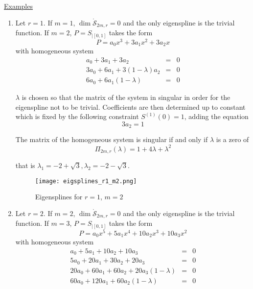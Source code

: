 \underline{Examples}
\begin{enumerate}
  \item Let $r=1$. If $m=1$, $\dim \mathring{\mathscr{S}}_{2m,r} = 0$ and the only eigenspline is the trivial 
      function.
      If $m=2$, $P = S_{|[0,1]}$ takes the form \begin{equation*}
	P = a_0 x^3 + 3 a_1 x^2 + 3a_2 x
      \end{equation*}
      with homogeneous system
      \begin{equation*}
      \begin{array}{lcl}
       a_0 + 3a_1 + 3a_2 & = & 0 \\
       3a_0 + 6a_1 + 3(1-\lambda)a_2 & = & 0 \\
       6a_0 + 6a_1(1-\lambda) & = & 0
      \end{array}
      \end{equation*}
     
      $\lambda$ is chosen so that the matrix of the system in singular in order for the eigenspline not to be trivial.  
      Coefficients are then determined up to constant which is fixed by the following constraint $S^{(1)}(0) = 1$, 
      adding the equation
      \begin{equation*}
       3a_2 = 1
      \end{equation*}
      
      The matrix of the homogeneous system is singular if and only if $\lambda$ is a zero of \begin{equation*}
       \Pi_{2m, r}(\lambda) = 1+4\lambda+\lambda^2
      \end{equation*}
      
      that is $\lambda_1 = -2 + \sqrt{3}, \lambda_2 = -2 - \sqrt{3}$.

      \begin{figure}[!h]
	\centering
	\texttt{[image: eigsplines\_r1\_m2.png]}
	\caption{Eigensplines for $r=1$, $m=2$}
      \end{figure}
    \item Let $r=2$. If $m=2$, $\dim \mathring{\mathscr{S}}_{2m,r} = 0$ and the only eigenspline is the trivial 
      function. If $m=3$, $P = S_{|[0,1]}$ takes the form   
      \begin{equation*}
          P = a_0 x^5 + 5 a_1 x^4 + 10a_2 x^3 + 10a_3 x^2
      \end{equation*}
      with homogeneous system
      \begin{equation*}
      \begin{array}{lcl}
       a_0 + 5a_1 + 10a_2 + 10a_3 & = & 0 \\
       5a_0 + 20a_1 + 30a_2 + 20a_3 & = & 0 \\
       20a_0 + 60a_1 + 60a_2 + 20a_3(1-\lambda) & = & 0 \\
       60a_0 + 120a_1 + 60a_2(1-\lambda) & = & 0
      \end{array}
      \end{equation*}
	   

\end{enumerate}
